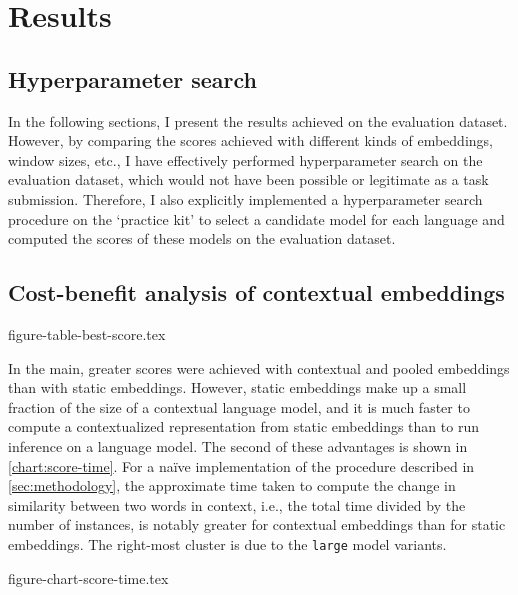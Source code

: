 \section{Results}
\label{sec:results}

\subsection{Hyperparameter search}

In the following sections, I present the results achieved on the evaluation dataset.
However, by comparing the scores achieved with different kinds of embeddings, window
sizes, etc., I have effectively performed hyperparameter search on the evaluation
dataset, which would not have been possible or legitimate as a task submission.
Therefore, I also explicitly implemented a hyperparameter search procedure on the
`practice kit' to select a candidate model for each language and computed the scores of
these models on the evaluation dataset.
\\

\subsection{Cost-benefit analysis of contextual embeddings}
\label{sec:cost-benefit}

{figure-table-best-score.tex}

In the main, greater scores were achieved with contextual and pooled embeddings than
with static embeddings.
However, static embeddings make up a small fraction of the size of a contextual
language model, and it is much faster to compute a contextualized representation from
static embeddings than to run inference on a language model.
The second of these advantages is shown in \cref{chart:score-time}.
For a naïve implementation of the procedure described in \cref{sec:methodology}, the
approximate time taken to compute the change in similarity between two words in
context, i.e., the total time divided by the number of instances, is notably greater
for contextual embeddings than for static embeddings.
The right-most cluster is due to the \texttt{large} model variants.
\\

{figure-chart-score-time.tex}

